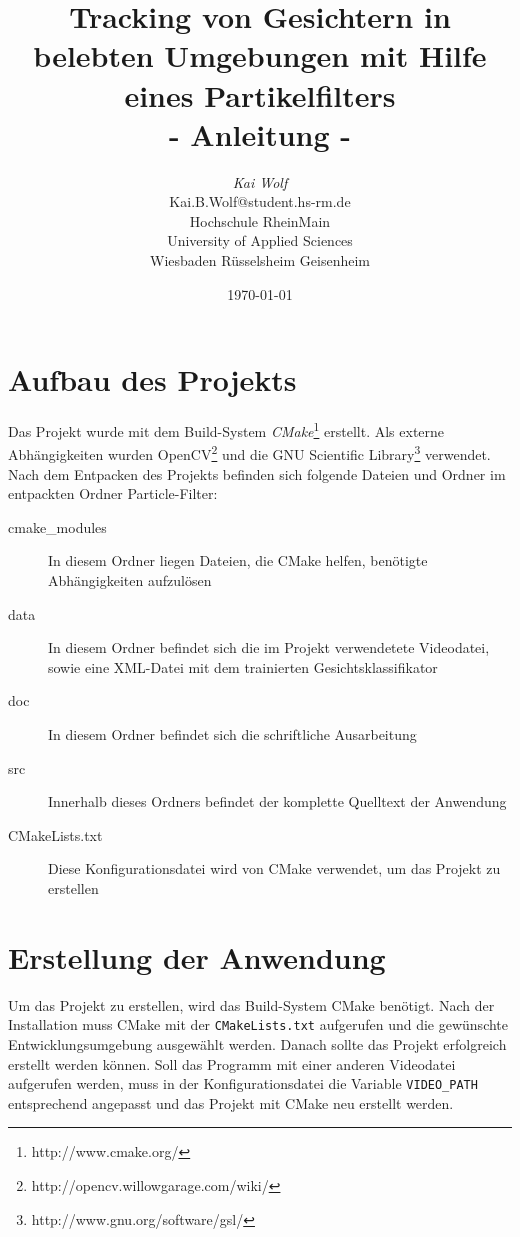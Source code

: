\documentclass[a4paper, 11pt, twocolumn]{article}
\begin{document}
\title{\textbf{Tracking von Gesichtern in belebten Umgebungen mit Hilfe eines Partikelfilters\\- Anleitung -}}
\author{ \textit{Kai Wolf} \\ Kai.B.Wolf@student.hs-rm.de\vspace{0.8cm}\\Hochschule RheinMain\\University of Applied Sciences\\Wiesbaden Rüsselsheim Geisenheim}
\date{\today} 
\maketitle

\section{Aufbau des Projekts} %
\label{sec:aufbau_des_projekts}

Das Projekt wurde mit dem Build-System \emph{CMake}\footnote{http://www.cmake.org/} erstellt. Als externe Abhängigkeiten wurden OpenCV\footnote{http://opencv.willowgarage.com/wiki/} und die GNU Scientific Library\footnote{http://www.gnu.org/software/gsl/} verwendet. Nach dem Entpacken des Projekts befinden sich folgende Dateien und Ordner im entpackten Ordner Particle-Filter:

\begin{description}
	\item[cmake\_modules] In diesem Ordner liegen Dateien, die CMake helfen, benötigte Abhängigkeiten aufzulösen
	\item[data] In diesem Ordner befindet sich die im Projekt verwendetete Videodatei, sowie eine XML-Datei mit dem trainierten Gesichtsklassifikator
	\item[doc] In diesem Ordner befindet sich die schriftliche Ausarbeitung
	\item[src] Innerhalb dieses Ordners befindet der komplette Quelltext der Anwendung
	\item[CMakeLists.txt] Diese Konfigurationsdatei wird von CMake verwendet, um das Projekt zu erstellen
\end{description}


\section{Erstellung der Anwendung} %
\label{sec:erstellung_der_anwendung}

Um das Projekt zu erstellen, wird das Build-System CMake benötigt. Nach der Installation muss CMake mit der \texttt{CMakeLists.txt} aufgerufen und die gewünschte Entwicklungsumgebung ausgewählt werden. Danach sollte das Projekt erfolgreich erstellt werden können. Soll das Programm mit einer anderen Videodatei aufgerufen werden, muss in der Konfigurationsdatei die Variable \texttt{VIDEO\_PATH} entsprechend angepasst und das Projekt mit CMake neu erstellt werden.

\end{document}
